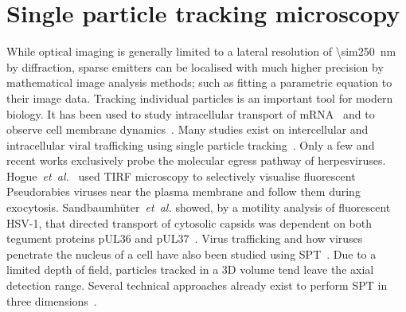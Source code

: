 \section{Single particle tracking microscopy}

While optical imaging is generally limited to a lateral resolution of \SI{\sim250}{\nano\metre} by diffraction, sparse emitters can be localised with much higher precision by mathematical image analysis methods; such as fitting a parametric equation to their image data.
Tracking individual particles is an important tool for modern biology.
It has been used to study intracellular transport of mRNA~\cite{spilleDirectObservationMobility2015} and to observe cell membrane dynamics~\cite{cognetAdvancesLivecellSingleparticle2014}.
Many studies exist on intercellular and intracellular viral trafficking
using single particle tracking~\cite{brandenburgVirusTraffickingLearning2007a}.
Only a few and recent works exclusively probe the molecular egress pathway of herpesviruses.
Hogue~\emph{et~al.}~\cite{hogueCellularMechanismsAlpha2014} used \gls{TIRF} microscopy to selectively visualise fluorescent Pseudorabies viruses near the plasma membrane and follow them during exocytosis.
Sandbaumhüter~\emph{et~al.} showed, by a motility analysis of fluorescent \gls{HSV}-1, that directed transport of cytosolic capsids was dependent on both tegument proteins pUL36 and pUL37~\cite{sandbaumhuterCytosolicHerpesSimplex2013}.
Virus trafficking and how viruses penetrate the nucleus of a cell have also been studied using \gls{SPT}~\cite{brandenburg_virus_2007}.
Due to a limited depth of field, particles tracked in a \gls{3D} volume tend leave the axial detection range.
Several technical approaches already exist to perform \gls{SPT} in three dimensions~\cite{
toprakThreeDimensionalParticleTracking2007,
juetteThreeDimensionalTrackingSingle2010,
wellsTimeResolved3D2010a,
spilleDynamicThreedimensionalTracking2012a}.

